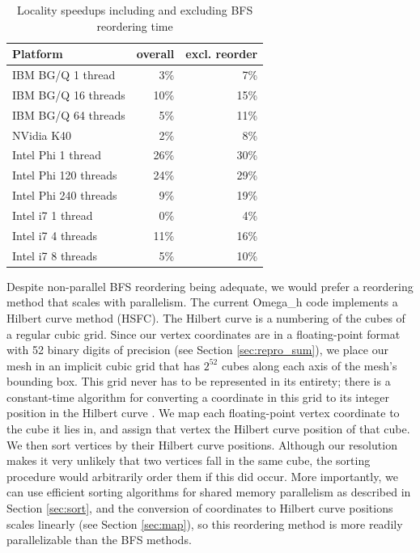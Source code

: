 \begin{table}
\begin{center}
\caption{Locality speedups including and excluding BFS reordering time}
\label{tab:reorder-speed}
\begin{tabular}{l|r|r}
Platform           & overall & excl. reorder \\ \hline
IBM BG/Q 1 thread     &  3\% &  7\% \\
IBM BG/Q 16 threads   & 10\% & 15\% \\
IBM BG/Q 64 threads   &  5\% & 11\% \\
NVidia K40            &  2\% &  8\% \\
Intel Phi 1 thread    & 26\% & 30\% \\
Intel Phi 120 threads & 24\% & 29\% \\
Intel Phi 240 threads &  9\% & 19\% \\
Intel i7 1 thread     &  0\% &  4\% \\
Intel i7 4 threads    & 11\% & 16\% \\
Intel i7 8 threads    &  5\% & 10\% \\
\end{tabular}
\end{center}
\end{table}

Despite non-parallel BFS reordering being adequate, we would prefer
a reordering method that scales with parallelism.
The current Omega\_h code implements a Hilbert curve method (HSFC).
The Hilbert curve is a numbering of the cubes of a regular cubic grid.
Since our vertex coordinates are in a floating-point format with
52 binary digits of precision (see Section \ref{sec:repro_sum}),
we place our mesh in an implicit cubic grid that has $2^{52}$
cubes along each axis of the mesh's bounding box.
This grid never has to be represented in its entirety; there
is a constant-time algorithm for converting a coordinate in this
grid to its integer position in the Hilbert curve
\cite{skilling2004programming}.
We map each floating-point vertex coordinate to the cube it
lies in, and assign that vertex the Hilbert curve position of that
cube.
We then sort vertices by their Hilbert curve positions.
Although our resolution makes it very unlikely that two
vertices fall in the same cube, the sorting procedure would
arbitrarily order them if this did occur.
More importantly, we can use efficient sorting algorithms for
shared memory parallelism as described in Section \ref{sec:sort},
and the conversion of coordinates to Hilbert curve positions
scales linearly (see Section \ref{sec:map}), so this reordering
method is more readily parallelizable than the BFS methods.

